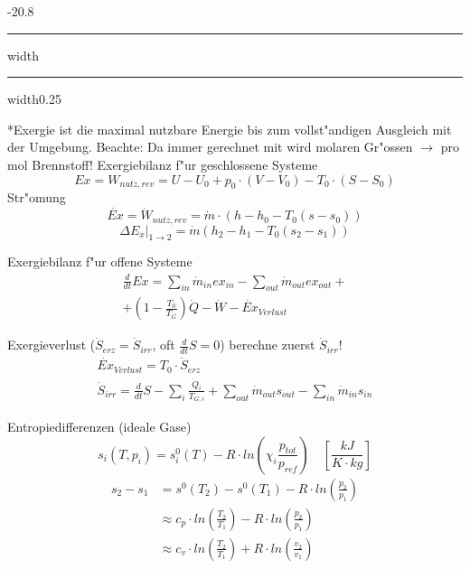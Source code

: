 \documentclass[8pt, landscape, fleqn]{scrartcl}
\makeatletter
\renewcommand{\section}{\@startsection{section}{1}{0mm}%
{-2\baselineskip}{0.8\baselineskip}%
{\hrule depth 0.2pt width\columnwidth\hrule depth1.5pt
width0.25\columnwidth\vspace*{1.2em}\Large\bfseries\rmfamily}}
\makeatother
\begin{document}
\begin{multicols*}{3}
\section*{Exergie}
ist die maximal nutzbare Energie bis zum vollst"andigen Ausgleich mit der Umgebung. Beachte: Da immer gerechnet mit wird molaren Gr"ossen $\rightarrow$ pro mol Brennstoff!
\newline
\newline
Exergiebilanz f"ur geschlossene Systeme
\begin{equation}
Ex = W_{nutz, rev} = U - U_0 + p_0 \cdot \left( V - V_0 \right) - T_0\cdot \left( S - S_0 \right)
\end{equation}
Str"omung
\begin{equation}
\dot{Ex} = \dot{W}_{nutz, rev} = \dot{m} \cdot \left( h-h_0 -T_0 (s-s_0) \right)
\end{equation}
\begin{equation}
\Delta{E_x} |_{1\rightarrow 2} = \dot{m} (h_2-h_1 - T_0(s_2-s_1))
\end{equation}

Exergiebilanz f"ur offene Systeme
\begin{equation}
\begin{split}
\frac{d}{dt} Ex = \sum_{in} \dot{m}_{in} ex_{in} - \sum_{out} \dot{m}_{out} ex_{out} + \\ + \left( 1- \frac{T_0}{T_G} \right) \dot{Q} -\dot{W} - \dot{Ex}_{Verlust}
\end{split}
\end{equation}

Exergieverlust ($\dot{S}_{erz} = \dot{S}_{irr}$, oft $\frac{d}{dt} S = 0$) berechne zuerst $\dot{S}_{irr}$!
\begin{equation}
\begin{split}
\dot{Ex}_{Verlust} = T_0 \cdot \dot{S}_{erz} \\ \dot{S}_{irr}= \frac{d}{dt} S - \sum_i \frac{\dot{Q}_i}{T_{G,i}} + \sum_{out} \dot{m}_{out} s_{out} -\sum_{in} \dot{m}_{in} s_{in}
\end{split}
\end{equation}

Entropiedifferenzen (ideale Gase)
\begin{equation}
s_i(T,p_i) = s^0_i(T) - R \cdot ln\left(\chi_i \frac{p_{tot}}{p_{ref}}\right) \quad \left[ \frac{kJ}{K\cdot kg}\right]
\end{equation}
\begin{equation}
\begin{split}
s_2 - s_1 &= s^0(T_2) - s^0(T_1) - R \cdot ln \left( \frac{p_2}{p_1} \right) \\\ 
&\approx c_p \cdot ln \left( \frac{T_2}{T_1} \right) - R \cdot ln \left( \frac{p_2}{p_1} \right) \\\
& \approx c_v \cdot ln \left( \frac{T_2}{T_1} \right) + R \cdot  ln \left( \frac{v_2}{v_1} \right)
\end{split}
\end{equation}


\end{multicols*}
\end{document}
